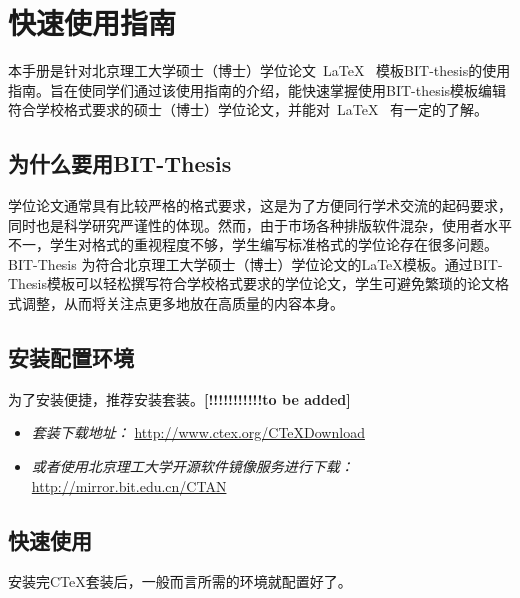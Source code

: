 
\chapter{快速使用指南}
\label{chap:what}

本手册是针对北京理工大学硕士（博士）学位论文~\LaTeX~ 模板BIT-thesis的使用指南。旨在使同学们通过该使用指南的介绍，能快速掌握使用BIT-thesis模板编辑符合学校格式要求的硕士（博士）学位论文，并能对~\LaTeX~ 有一定的了解。

\section{为什么要用BIT-Thesis}
\label{sec:why}
学位论文通常具有比较严格的格式要求，这是为了方便同行学术交流的起码要求，同时也是科学研究严谨性的体现。然而，由于市场各种排版软件混杂，使用者水平不一，学生对格式的重视程度不够，学生编写标准格式的学位论存在很多问题。BIT-Thesis 为符合北京理工大学硕士（博士）学位论文的LaTeX模板。通过BIT-Thesis模板可以轻松撰写符合学校格式要求的学位论文，学生可避免繁琐的论文格式调整，从而将关注点更多地放在高质量的内容本身。

\section{安装配置环境}
\label{sec:requirements}

为了安装便捷，推荐安装\CTeX 套装。\textbf{[!!!!!!!!!!!to be added]}

\begin{itemize}
\item \textit{\CTeX 套装下载地址：}  \url{http://www.ctex.org/CTeXDownload}

\item \textit{或者使用北京理工大学开源软件镜像服务进行下载：}  \url{http://mirror.bit.edu.cn/CTAN}

\end{itemize}



\section{快速使用}
\label{sec:process}

安装完CTeX套装后，一般而言所需的环境就配置好了。


